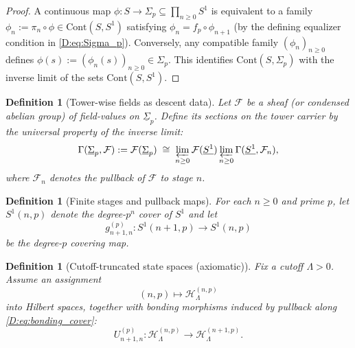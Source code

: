 \documentclass[11pt]{article}
\newtheorem{definition}[theorem]{Definition}
\theoremstyle{remark}
\begin{document}
{\begin{proof}
A continuous map $\phi:S\to \Sigma_{p}\subseteq\prod_{n\ge 0}S^{1}$ is equivalent to a family $\phi_{n}:=\pi_{n}\circ\phi\in\mathrm{Cont}(S,S^{1})$ satisfying $\phi_{n}=f_{p}\circ \phi_{n+1}$ (by the defining equalizer condition in \eqref{D:eq:Sigma_p}).
Conversely, any compatible family $(\phi_{n})_{n\ge 0}$ defines $\phi(s):=(\phi_{n}(s))_{n\ge 0}\in\Sigma_{p}$.
This identifies $\mathrm{Cont}(S,\Sigma_{p})$ with the inverse limit of the sets $\mathrm{Cont}(S,S^{1})$.
\end{proof}

\begin{definition}[Tower-wise fields as descent data]\label{D:def:tower_fields}
Let $\mathcal F$ be a sheaf (or condensed abelian group) of field-values on $\underline{\Sigma}_{p}$.
Define its sections on the tower carrier by the universal property of the inverse limit:
\begin{equation}
\Gamma(\underline{\Sigma}_{p},\mathcal F)
:=
\mathcal F(\underline{\Sigma}_{p})
\;\cong\;
\varprojlim_{n\ge 0}\mathcal F(\underline{S^{1}})
\varprojlim_{n\ge 0}\Gamma(\underline{S^{1}},\mathcal F_{n}),
\label{D:eq:sections_descent}
\end{equation}
where $\mathcal F_{n}$ denotes the pullback of $\mathcal F$ to stage $n$.
\end{definition} 
\begin{definition}[Finite stages and pullback maps]\label{D:def:finite_stages}
For each $n\ge 0$ and prime $p$, let $S^{1}(n,p)$ denote the degree-$p^{n}$ cover of $S^{1}$ and let
\begin{equation}
g_{n+1,n}^{(p)}:S^{1}(n{+}1,p)\longrightarrow S^{1}(n,p)
\label{D:eq:bonding_cover}
\end{equation}
be the degree-$p$ covering map.
\end{definition}

\begin{definition}[Cutoff-truncated state spaces (axiomatic)]\label{D:def:Hilb_cutoff}
Fix a cutoff $\Lambda>0$.
Assume an assignment
\begin{equation}
(n,p)\longmapsto \mathcal H_{\Lambda}^{(n,p)}
\label{D:eq:H_assign}
\end{equation}
into Hilbert spaces, together with bonding morphisms induced by pullback along \eqref{D:eq:bonding_cover}:
\begin{equation}
U^{(p)}_{n+1,n}:\mathcal H_{\Lambda}^{(n,p)}\longrightarrow \mathcal H_{\Lambda}^{(n+1,p)}.
\label{D:eq:U_bonding}
\end{equation}
\end{definition}

}
\end{document}
